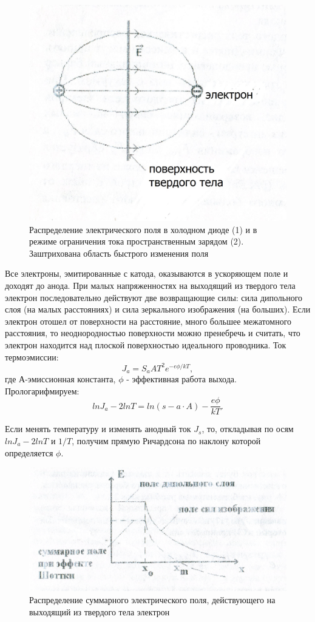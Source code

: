 \begin{figure}[h!]
	\centering
	\includegraphics[width=0.5\linewidth]{fig/img8083.jpg}
	\caption{Распределение электрического поля в холодном диоде (1) и в режиме ограничения тока пространственным зарядом (2). Заштрихована область быстрого изменения поля}
	\label{fig:6}
\end{figure}

Все электроны, эмитированные с катода, оказываются в ускоряющем поле и доходят до анода. При малых напряженностях на выходящий из твердого тела электрон последовательно действуют две возвращающие силы: сила дипольного слоя (на малых расстояниях) и сила зеркального изображения (на больших). Если электрон отошел от поверхности на расстояние, много большее межатомного расстояния, то неоднородностью поверхности можно пренебречь и считать, что электрон находится над плоской поверхностью идеального проводника. 
Ток термоэмиссии:
\begin{equation}
J_a=S_a A T^2 e^{-e \phi /kT},
\end{equation}
где А-эмиссионная константа, $\phi$ - эффективная работа выхода. Прологарифмируем:
\begin{equation}
lnJ_a-2lnT=ln(s-a \cdot A)-\frac{e\phi}{kT}.
\end{equation}

Если менять температуру и изменять анодный ток $J_s$, то, откладывая по осям $lnJ_a-2lnT$ и $1/T$, получим прямую Ричардсона по наклону которой определяется $\phi$.

\begin{figure}[H]
	\centering
	\includegraphics[width=0.75\linewidth]{fig/img8084.jpg}
	\caption{Распределение суммарного электрического поля, действующего на выходящий из твердого тела электрон}
	\label{fig:7}
\end{figure}

